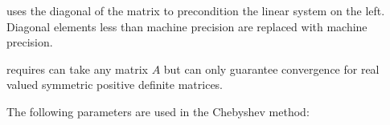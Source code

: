 \ifpacktwo{} uses the diagonal of the matrix to precondition the linear system on the
left. Diagonal elements less than machine precision are replaced with machine
precision.

\ifpacktwo{} requires can take any matrix $A$ but can only guarantee convergence
for real valued symmetric positive definite matrices.
\iffalse
If users could provide the ellipse parameters ($d$ and $c$ in the literature,
where $d$ is the real-valued center of the ellipse, and $d-c$ and $d+c$ the two
foci), the iteration itself would work fine with nonsymmetric real-valued $A$,
as long as the eigenvalues of $A$ can be bounded in an ellipse that is entirely
to the right of the origin.
\unsure[inline]{AP}{Really unsure about Chebyshev nonsymmetric matrices. There does not
seem anything in the code to work with ellipse. I need to ask Mark Hoemmen
about this.}
\fi

The following parameters are used in the Chebyshev method:

